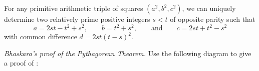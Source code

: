 \begin{corollary}
  For any primitive arithmetic triple of squares $(a^2,b^2,c^2)$, we can uniquely determine two relatively prime positive integers $s<t$ of opposite parity such that
  \begin{equation*}
    a=2st-t^2+s^2,\qquad b=t^2+s^2,\qquad\text{and}\qquad c=2st+t^2-s^2
  \end{equation*}
  with common difference $d= 2st(t-s)^2$.
\end{corollary}

\exercises

\begin{starter}
  \exercise \emph{Bhaskara's proof of the Pythagorean Theorem.} Use the following diagram to give a proof of :
  \begin{figure}[H]
    \centering
  \end{figure}
  
\end{starter}

